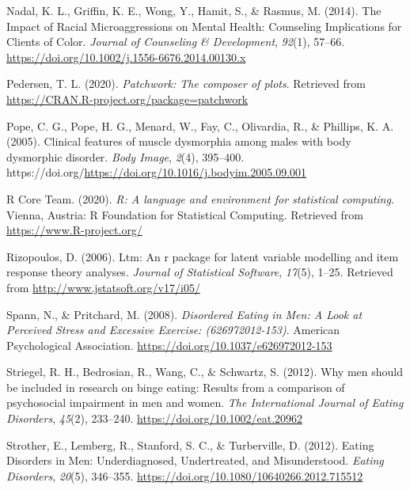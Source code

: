 \documentclass[
  english,
  man, fleqn, noextraspace,floatsintext]{apa6}
\newlength{\cslhangindent}
\newlength{\cslentryspacingunit} %
\newenvironment{CSLReferences}[2] %
 {%
  \setlength{\parindent}{0pt}
  \ifodd #1
  \let\oldpar\par
  \def\par{\hangindent=\cslhangindent\oldpar}
  \fi
  \setlength{\parskip}{#2\cslentryspacingunit}
 }%
 {}
\begin{document}
\begin{CSLReferences}{1}{0}
\leavevmode{}%
Nadal, K. L., Griffin, K. E., Wong, Y., Hamit, S., \& Rasmus, M. (2014). The {Impact} of {Racial} {Microaggressions} on {Mental} {Health}: {Counseling} {Implications} for {Clients} of {Color}. \emph{Journal of Counseling \& Development}, \emph{92}(1), 57--66. \url{https://doi.org/10.1002/j.1556-6676.2014.00130.x}

\leavevmode{}%
Pedersen, T. L. (2020). \emph{Patchwork: The composer of plots}. Retrieved from \url{https://CRAN.R-project.org/package=patchwork}

\leavevmode{}%
Pope, C. G., Pope, H. G., Menard, W., Fay, C., Olivardia, R., \& Phillips, K. A. (2005). Clinical features of muscle dysmorphia among males with body dysmorphic disorder. \emph{Body Image}, \emph{2}(4), 395--400. https://doi.org/\url{https://doi.org/10.1016/j.bodyim.2005.09.001}

\leavevmode{}%
R Core Team. (2020). \emph{R: A language and environment for statistical computing}. Vienna, Austria: R Foundation for Statistical Computing. Retrieved from \url{https://www.R-project.org/}

\leavevmode{}%
Rizopoulos, D. (2006). Ltm: An r package for latent variable modelling and item response theory analyses. \emph{Journal of Statistical Software}, \emph{17}(5), 1--25. Retrieved from \url{http://www.jstatsoft.org/v17/i05/}

\leavevmode{}%
Spann, N., \& Pritchard, M. (2008). \emph{Disordered {Eating} in {Men}: {A} {Look} at {Perceived} {Stress} and {Excessive} {Exercise}: (626972012-153)}. American Psychological Association. \url{https://doi.org/10.1037/e626972012-153}

\leavevmode{}%
Striegel, R. H., Bedrosian, R., Wang, C., \& Schwartz, S. (2012). Why men should be included in research on binge eating: Results from a comparison of psychosocial impairment in men and women. \emph{The International Journal of Eating Disorders}, \emph{45}(2), 233--240. \url{https://doi.org/10.1002/eat.20962}

\leavevmode{}%
Strother, E., Lemberg, R., Stanford, S. C., \& Turberville, D. (2012). Eating {Disorders} in {Men}: {Underdiagnosed}, {Undertreated}, and {Misunderstood}. \emph{Eating Disorders}, \emph{20}(5), 346--355. \url{https://doi.org/10.1080/10640266.2012.715512}


\end{CSLReferences}
\end{document}
